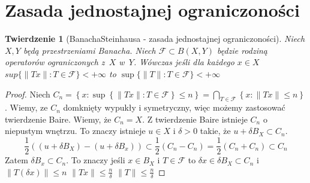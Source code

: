 \documentclass[11pt]{mwrep}
\renewcommand{\[}{\begin{equation}}
\renewcommand{\]}{\end{equation}}
\newtheorem{twr}[subsection]{Twierdzenie}%
\begin{document}
\section{Zasada jednostajnej ograniczoności}
\begin{twr}[Banacha\dywiz Steinhausa - zasada jednostajnej ograniczoności]
	Niech $X,Y$ będą przestrzeniami Banacha. Niech $\mathcal{F} \subset B(X,Y)$ będzie rodziną operatorów ograniczonych z~$X$ w~$Y$.
	Wówczas jeśli dla każdego $x \in X$ $sup \{\|Tx\|: T \in \mathcal{F}\} < + \infty$ to $\sup \{ \|T\|: T \in \mathcal{F} \} < +\infty$
\end{twr}
\begin{proof}
	Niech $C_n = \left\{ x : \sup\left\{ \|Tx\|: T\in \mathcal{F} \right\}\le n \right\} = \bigcap_{T \in \mathcal{F}}\left\{ x : \|Tx\|\le n \right\}$.
	Wiemy, ze $C_n$ domknięty wypukły i symetryczny, więc możemy zastosować twierdzenie Baire. 
	Wiemy, że $C_n = X$. Z twierdzenie Baire istnieje $C_n$ o niepustym wnętrzu. To znaczy istnieje $u \in X$ i $\delta>0$ takie, że 
	$u + \delta B_X \subset C_n$.
	$$\frac{1}{2}\left( (u +\delta B_X) - (u + \delta B_x)  \right) \subset \frac{1}{2}(C_n - C_n) = \frac{1}{2}(C_n + C_n) \subset C_n$$
	Zatem $\delta B_x \subset C_n$. To znaczy jeśli $x \in B_X$ i $T \in \mathcal{F}$ to $\delta x \in \delta B_X \subset C_n$ 
	i $\|T(\delta x)\| \le n$  $\|Tx\| \le \frac{n}{\delta}$ $\|T\| \le \frac{n}{\delta}$ 
\end{proof}
\end{document}
